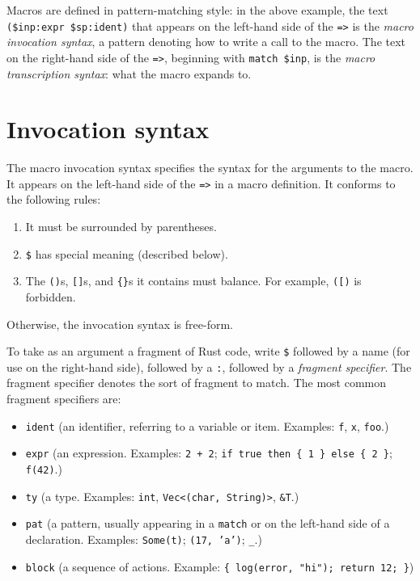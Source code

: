 \documentclass[]{article}
\begin{document}
Macros are defined in pattern-matching style: in the above example, the
text \texttt{(\$inp:expr \$sp:ident)} that appears on the left-hand side
of the \texttt{=\textgreater{}} is the \emph{macro invocation syntax}, a
pattern denoting how to write a call to the macro. The text on the
right-hand side of the \texttt{=\textgreater{}}, beginning with
\texttt{match \$inp}, is the \emph{macro transcription syntax}: what the
macro expands to.

\section{Invocation syntax}\label{invocation-syntax}

The macro invocation syntax specifies the syntax for the arguments to
the macro. It appears on the left-hand side of the
\texttt{=\textgreater{}} in a macro definition. It conforms to the
following rules:

\begin{enumerate}
\def\labelenumi{\arabic{enumi}.}
\itemsep1pt\parskip0pt
\item
  It must be surrounded by parentheses.
\item
  \texttt{\$} has special meaning (described below).
\item
  The \texttt{()}s, \texttt{{[}{]}}s, and \texttt{\{\}}s it contains
  must balance. For example, \texttt{({[})} is forbidden.
\end{enumerate}

Otherwise, the invocation syntax is free-form.

To take as an argument a fragment of Rust code, write \texttt{\$}
followed by a name (for use on the right-hand side), followed by a
\texttt{:}, followed by a \emph{fragment specifier}. The fragment
specifier denotes the sort of fragment to match. The most common
fragment specifiers are:

\begin{itemize}
\itemsep1pt\parskip0pt
\item
  \texttt{ident} (an identifier, referring to a variable or item.
  Examples: \texttt{f}, \texttt{x}, \texttt{foo}.)
\item
  \texttt{expr} (an expression. Examples: \texttt{2 + 2};
  \texttt{if true then \{ 1 \} else \{ 2 \}}; \texttt{f(42)}.)
\item
  \texttt{ty} (a type. Examples: \texttt{int},
  \texttt{Vec\textless{}(char, String)\textgreater{}}, \texttt{\&T}.)
\item
  \texttt{pat} (a pattern, usually appearing in a \texttt{match} or on
  the left-hand side of a declaration. Examples: \texttt{Some(t)};
  \texttt{(17, 'a')}; \texttt{\_}.)
\item
  \texttt{block} (a sequence of actions. Example:
  \texttt{\{ log(error, "hi"); return 12; \}})
\end{itemize}
\end{document}
